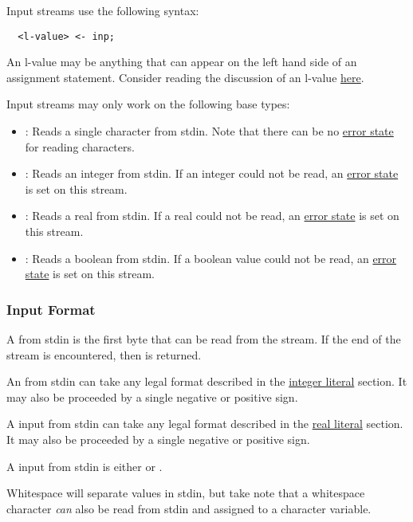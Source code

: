 \documentclass[streams.tex]{subfiles}
\begin{document}
Input streams use the following syntax:
\begin{lstlisting}
  <l-value> <- inp;
\end{lstlisting}

An l-value may be anything that can appear on the left hand side of an assignment statement.
Consider reading the discussion of an l-value
\href{https://en.wikipedia.org/wiki/Value_(computer_science)\#Assignment:_l-values_and_r-values}
{here}.

Input streams may only work on the following base types:
\begin{itemize}
  \item
    : Reads a single character from stdin. Note that there can be no
    \hyperref[sssec:stream_error]{error state} for reading characters.
  \item {}:
    Reads an integer from stdin. If an integer could not be read, an \hyperref[sssec:stream_error]
    {error state} is set on this stream.
  \item {}:
    Reads a real from stdin. If a real could not be read, an \hyperref[sssec:stream_error]{error
    state} is set on this stream.
  \item {}:
    Reads a boolean from stdin. If a boolean value could not be read, an
    \hyperref[sssec:stream_error]{error state} is set on this stream.
\end{itemize}

\subsubsection{Input Format}
\label{sssec:input_format}
A  from stdin is the first byte that can be read from the stream. If the end of the
stream is encountered, then  is returned.

An  from stdin can take any legal format described in the \hyperref[sssec:integer_lit]
{integer literal} section. It may also be proceeded by a single negative or positive sign.

A  input from stdin can take any legal format described in the \hyperref[sssec:real_lit]
{real literal} section. It may also be proceeded by a single negative or positive sign.

A  input from stdin is either  or .

Whitespace will separate values in stdin, but take note that a whitespace character \textit{can} also be read from
stdin and assigned to a character variable.
\end{document}
